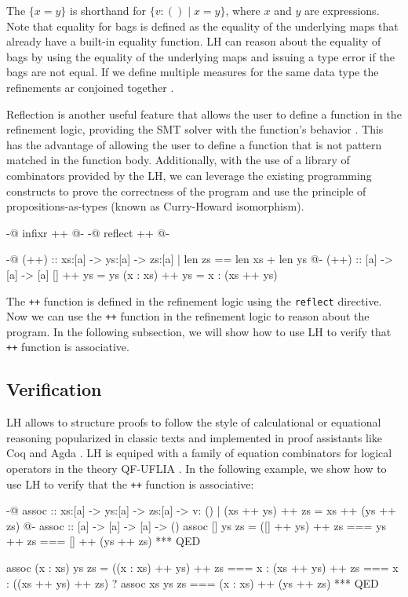 \documentclass[]{rptuseminar}
\begin{document}
The $\{x = y\}$ is shorthand for $\{ v : () \mid x = y \}$, where $x$ and $y$ are expressions.
Note that equality for bags is defined as the equality of the underlying maps that already have a built-in equality function.
LH can reason about the equality of bags by using the equality of the underlying maps and issuing a type error if the bags are not equal.
If we define multiple measures for the same data type the refinements ar conjoined together \cite{niki_lecture_2024}.



Reflection is another useful feature that allows the user to define a function in the refinement logic, providing
the SMT solver with the function's behavior \cite{vazou_refinement_2018}. 
This has the advantage of allowing the user to define a function that is not pattern matched in the function body.
Additionally, with the use of a library of combinators provided by the LH, we can leverage the existing programming constructs to 
prove the correctness of the program and use the principle of propositions-as-types (known as Curry-Howard isomorphism)\cite{vazou_refinement_2018}\cite{wadler_propositions_2015}.

\begin{haskell}
{-@ infixr ++ @-}
{-@ reflect ++ @-}

{-@ (++) :: xs:[a] -> ys:[a] -> { zs:[a] | len zs == len xs + len ys } @-}
(++) :: [a] -> [a] -> [a]
[] ++ ys = ys
(x : xs) ++ ys = x : (xs ++ ys)
\end{haskell}

The \texttt{++} function is defined in the refinement logic using the \texttt{reflect} directive.
Now we can use the \texttt{++} function in the refinement logic to reason about the program.
In the following subsection, we will show how to use LH to verify that \texttt{++} function is associative.

\subsection{Verification}
LH allows to structure proofs to follow the style of calculational or equational reasoning popularized in classic texts
and implemented in proof assistants like Coq and Agda . LH is equiped with a family of equation combinators
for logical operators in the theory QF-UFLIA \cite{vazou_refinement_2018}.
In the following example, we show how to use LH to verify that the \texttt{++} function is associative:

\begin{haskell}
{-@ assoc :: xs:[a] -> ys:[a] -> zs:[a] 
  -> { v: () | (xs ++ ys) ++ zs = xs ++ (ys ++ zs) } @-}
assoc :: [a] -> [a] -> [a] -> ()
assoc [] ys zs =
  ([] ++ ys)
    ++ zs
    === ys
    ++ zs
    === []
    ++ (ys ++ zs)
    *** QED

assoc (x : xs) ys zs =
  ((x : xs) ++ ys)
    ++ zs
    ===  x : (xs ++ ys) ++ zs
    === x
    : ((xs ++ ys) ++ zs)
      ? assoc xs ys zs
      === (x : xs)
      ++ (ys ++ zs)
      *** QED
\end{haskell}
\end{document}
